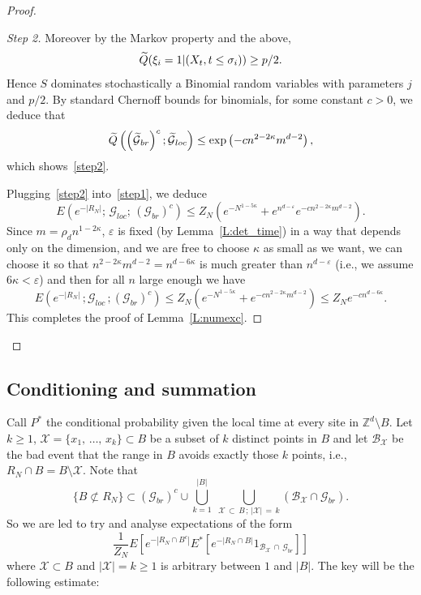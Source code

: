 \documentclass[10pt]{amsart}
\theoremstyle{definition}\newtheorem{defi}[theo]{Definition}\newtheorem{rema}[theo]{Remark}\newtheorem{exam}[theo]{Example}\newtheorem{exem}[theo]{Example}\newtheorem{nota}[theo]{Notation}
\newenvironment{step}[1]{\begin{proof}[#1]}{\let\qed\relax\end{proof}}
\newcommand{\Pmh}{P}
\newcommand*\E {{E}}
\newcommand{\cB}{\mathcal{B}}
\newcommand{\cG}{\mathcal{G}}
\newcommand{\cX}{\mathcal{X}}
\newcommand*\Q{{Q}}
\newcommand*\eps{\varepsilon}
\let\oldtilde\tilde
\renewcommand*{\tilde}[1]{\mathchoice{\widetilde{#1}}{\widetilde{#1}}{\oldtilde{#1}}{\oldtilde{#1}}}\let\oldhat\hat
\renewcommand*{\hat}[1]{\mathchoice{\widehat{#1}}{\widehat{#1}}{\oldhat{#1}}{\oldhat{#1}}}\let\oldexists\exists
\renewcommand*{\exists}{\mathrel{\oldexists}}
\begin{document}
\begin{proof}
\begin{step}{Step 2}
Moreover by the Markov property and the above,
\[
\tilde \Q(\xi_i = 1 | (X_t, t \le \sigma_i)) \ge p/2.
\]
Hence $S$ dominates stochastically a Binomial random variables with parameters $j$ and $p/2$. By standard Chernoff bounds for binomials, for some constant $c>0$, we deduce that
\[
\tilde \Q \left(\left(\tilde \cG_{br}\right)^c; \tilde \cG_{loc}\right) \le \exp \left(- c n^{2- 2\kappa} m^{d-2}\right),
\]
which shows~\eqref{step2}.

Plugging~\eqref{step2} into~\eqref{step1}, we deduce
\[
\E \left(e^{ - |R_N|} ;\,{\cG_{loc}};\, {(\cG_{br})^c}\right) \le Z_N \left(e^{- N^{1- 5\kappa}} + e^{ n^{d-\eps}} e^{- c n^{2- 2\kappa} m^{d-2}}\right).
\]
Since $m = \rho_d n^{1- 2\kappa}$, $\eps$ is fixed (by Lemma~\ref{L:det_time}) in a way that depends only on the dimension, and we are free to choose $\kappa$ as small as we want, we can choose it so that $n^{2- 2 \kappa} m^{d-2} = n^{d - 6\kappa}$ is much greater than $ n^{d- \eps}$ (i.e., we assume $6\kappa < \eps$) and then for all $n$ large enough we have
\[
\E \left(e^{ - |R_N|}\,; {\cG_{loc}}\,; {(\cG_{br})^c}\right) \le Z_N \left(e^{ - N^{1- 5 \kappa}} + e^{ - c n^{2- 2\kappa} m^{d-2}}\right) \le Z_N e^{ - c n^{d- 6 \kappa}}.
\]
This completes the proof of Lemma~\ref{L:numexc}.\qedhere
\end{step}\let\qed\relax
\end{proof}


\subsection{Conditioning and summation}
\label{S:sum}

Call $\Pmh^*$ the conditional probability given the local time at every site in $\mathbb{Z}^d \setminus B$. Let $k\ge 1$, $\cX = \{x_1,\,\ldots, \,x_k \}\subset B $ be a subset of $k$ distinct points in $B$ and let $\cB_{\cX}$ be the bad event that the range in $B$ avoids exactly those $k$ points, i.e., $R_N \cap B = B \setminus \cX$. Note that
\begin{equation}\label{eq:decomp}
\{ B \not \subset R_N \} \subset (\cG_{br})^c \cup \bigcup_{k =1}^{|B|}\;\bigcup_{\cX\, \subset\,B\,;\,|\cX|\,=\,k} (\cB_{\cX} \cap \cG_{br}).
\end{equation}
So we are led to try and analyse expectations of the form
\[
\frac1{Z_N} \E\left[e^{ - |R_N\cap B^c|} \E^*\left[e^{- | R_N \cap B| }1_{\cB_{\cX}\,\cap\,\cG_{br}}\right] \right]
\]
where $\cX \subset B$ and $| \cX | = k \ge 1$ is arbitrary between $1$ and $|B|$. The key will be the following estimate:
\end{document}
